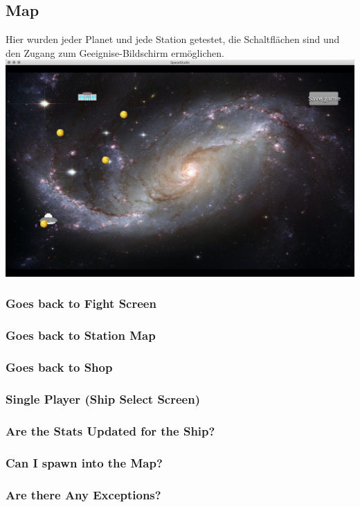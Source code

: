 \documentclass[11pt]{article}
\begin{document}
\subsection{Map}

Hier wurden jeder Planet und jede Station getestet, die Schaltflächen sind und den Zugang zum Geeignise-Bildschirm ermöglichen.\\
\includegraphics[scale=0.2]{TestProtocolBilder/map.png}
\subsubsection{Goes back to Fight Screen}
\subsubsection{Goes back to Station Map}
\subsubsection{Goes back to Shop}


\subsubsection{Single Player (Ship Select Screen)}

\subsubsection{Are the Stats Updated for the Ship?}
\subsubsection{Can I spawn into the Map?}
\subsubsection{Are there Any Exceptions?}
\end{document}
